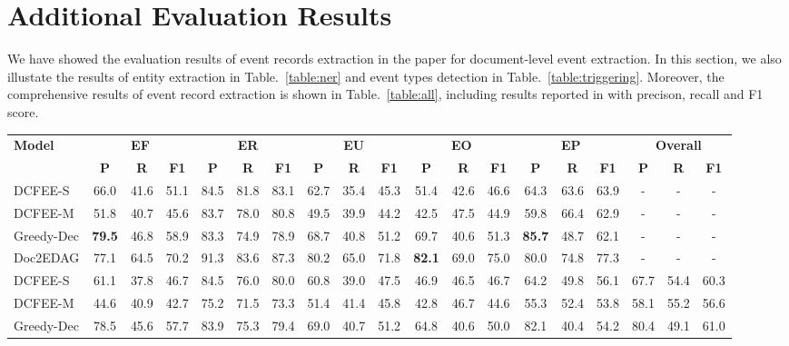 \documentclass[11pt,a4paper]{article}
\begin{document}
\section{Additional Evaluation Results}
\label{appendix-evaluation}
We have showed the evaluation results of event records extraction in the paper for document-level event extraction.
In this section, we also illustate the results of entity extraction in Table.~\ref{table:ner} and event types detection in Table.~\ref{table:triggering}.
Moreover, the comprehensive results of event record extraction is shown in Table.~\ref{table:all}, including results reported in \citet{zheng-etal-2019-doc2edag} with precison, recall and F1 score.


\begin{table*}[htbp]
\centering
\begin{adjustbox}{angle=90}
\begin{tabular}{lcccccccccccccccccc}
\hline
\multirow{2}{*}{\bf Model} & \multicolumn{3}{c}{\bf EF} & \multicolumn{3}{c}{\bf ER} & \multicolumn{3}{c}{\bf EU} & \multicolumn{3}{c}{\bf EO} & \multicolumn{3}{c}{\bf EP} & \multicolumn{3}{c}{\bf Overall}\\ 
\cmidrule(lr){2-4} 
\cmidrule(lr){5-7}
\cmidrule(lr){8-10}
\cmidrule(lr){11-13}
\cmidrule(lr){14-16}
\cmidrule(lr){17-19}
~ & \bf P & \bf R & \bf F1  & \bf P & \bf R & \bf F1 & \bf P & \bf R & \bf F1 & \bf P & \bf R & \bf F1 & \bf P & \bf R & \bf F1 & \bf P & \bf R & \bf F1 \\
\hline
DCFEE-S  & 66.0 & 41.6 & 51.1 & 84.5 & 81.8 & 83.1 & 62.7 & 35.4 & 45.3 & 51.4 & 42.6 & 46.6 & 64.3 & 63.6 & 63.9 & - & - & - \\
DCFEE-M  & 51.8 & 40.7 & 45.6 & 83.7 & 78.0 & 80.8 & 49.5 & 39.9 & 44.2 & 42.5 & 47.5 & 44.9 & 59.8 & 66.4 & 62.9 & - & - & - \\
Greedy-Dec  & \bf 79.5 & 46.8 & 58.9 & 83.3 & 74.9 & 78.9 & 68.7 & 40.8 & 51.2 & 69.7 & 40.6 & 51.3 & \bf 85.7 & 48.7 & 62.1 & - & - & - \\
Doc2EDAG  & 77.1 & 64.5 & 70.2 & 91.3 & 83.6 & 87.3 & 80.2 & 65.0 & 71.8 & \bf 82.1 & 69.0 & 75.0 & 80.0 & 74.8 & 77.3 & - & - & - \\
\hline
DCFEE-S  & 61.1 & 37.8 & 46.7 & 84.5 & 76.0 & 80.0 & 60.8 & 39.0 & 47.5 & 46.9 & 46.5 & 46.7 & 64.2 & 49.8 & 56.1 & 67.7 & 54.4 & 60.3 \\
DCFEE-M  & 44.6 & 40.9 & 42.7 & 75.2 & 71.5 & 73.3 & 51.4 & 41.4 & 45.8 & 42.8 & 46.7 & 44.6 & 55.3 & 52.4 & 53.8 & 58.1 & 55.2 & 56.6 \\
Greedy-Dec  & 78.5 & 45.6 & 57.7 & 83.9 & 75.3 & 79.4 & 69.0 & 40.7 & 51.2 & 64.8 & 40.6 & 50.0 & 82.1 & 40.4 & 54.2 & 80.4 & 49.1 & 61.0 \\

\end{tabular}
\end{adjustbox}
\end{table*}
\end{document}
